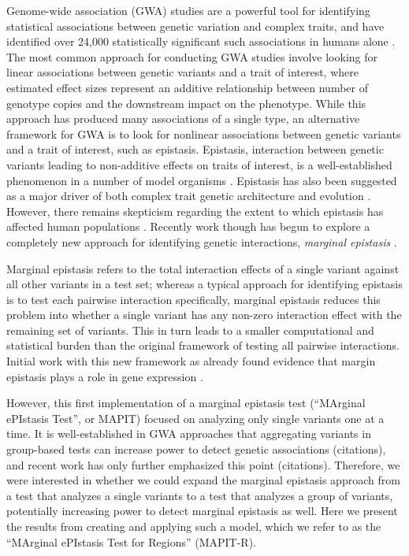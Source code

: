 \documentclass[12pt,a4paper]{article}
\begin{document}
Genome-wide association (GWA) studies are a powerful tool for identifying statistical associations between genetic variation and complex traits, and have identified over 24,000 statistically significant such associations in humans alone \citep{Buniello2019}. The most common approach for conducting GWA studies involve looking for linear associations between genetic variants and a trait of interest, where estimated effect sizes represent an additive relationship between number of genotype copies and the downstream impact on the phenotype. While this approach has produced many associations of a single type, an alternative framework for GWA is to look for nonlinear associations between genetic variants and a trait of interest, such as epistasis. Epistasis, interaction between genetic variants leading to non-additive effects on traits of interest, is a well-established phenomenon in a number of model organisms \citep{Lehner2006,Rowe2008,Shao2008,Flint2009,Costanzo2010,He2010,Jarvis2011,Pettersson2011,Bloom2013,Monnahan2015}. Epistasis has also been suggested as a major driver of both complex trait genetic architecture and evolution \citep{Carlborg2004,Carlborg2006,Martin2007,Phillips2008,Moore2009,Jones2014,Mackay2014}. However, there remains skepticism regarding the extent to which epistasis has affected human populations \citep{Hill2008,Crow2010,Aschard2012,Wood2014,Yang2015}. Recently work though has begun to explore a completely new approach for identifying genetic interactions, \textit{marginal epistasis} \citep{Crawford2017a}.

Marginal epistasis refers to the total interaction effects of a single variant against all other variants in a test set; whereas a typical approach for identifying epistasis is to test each pairwise interaction specifically, marginal epistasis reduces this problem into whether a single variant has any non-zero interaction effect with the remaining set of variants. This in turn leads to a smaller computational and statistical burden than the original framework of testing all pairwise interactions. Initial work with this new framework as already found evidence that margin epistasis plays a role in gene expression \citep{Crawford2017a}. 

However, this first implementation of a marginal epistasis test (``MArginal ePIstasis Test'', or MAPIT) focused on analyzing only single variants one at a time. It is well-established in GWA approaches that aggregating variants in group-based tests can increase power to detect genetic associations (citations), and recent work has only further emphasized this point (citations). Therefore, we were interested in whether we could expand the marginal epistasis approach from a test that analyzes a single variants to a test that analyzes a group of variants, potentially increasing power to detect marginal epistasis as well. Here we present the results from creating and applying such a model, which we refer to as the ``MArginal ePIstasis Test for Regions'' (MAPIT-R). 
\end{document}
